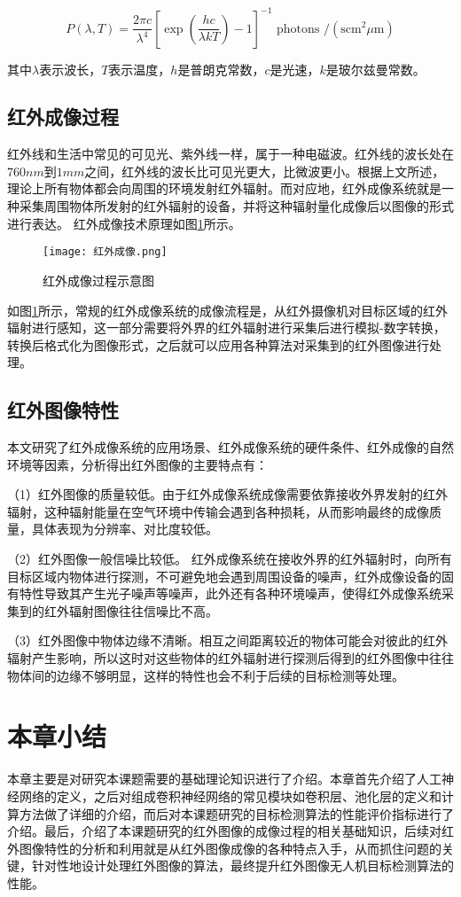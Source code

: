 \begin{equation}
    P(\lambda, T)=\frac{2 \pi c}{\lambda^{4}}\left[\exp \left(\frac{h c}{\lambda k T}\right)-1\right]^{-1} \text { photons } /\left(\mathrm{s} \mathrm{cm}^{2} \mu \mathrm{m}\right)
    \label{plank2}    
\end{equation}

其中$\lambda$表示波长，$T$表示温度，$h$是普朗克常数，$c$是光速，$k$是玻尔兹曼常数。

\subsection{红外成像过程}

红外线和生活中常见的可见光、紫外线一样，属于一种电磁波。红外线的波长处在$760nm$到$1mm$之间，红外线的波长比可见光更大，比微波更小。根据上文所述，理论上所有物体都会向周围的环境发射红外辐射。而对应地，红外成像系统就是一种采集周围物体所发射的红外辐射的设备，并将这种辐射量化成像后以图像的形式进行表达。
红外成像技术原理如图\ref{infra}所示\cite{倪国强2008中国红外成像技术发展的若干思考}。

\begin{figure}[htbp]
    \centering
    \texttt{[image: 红外成像.png]}
    \caption{红外成像过程示意图}
    \label{infra}
\end{figure}

如图\ref{infra}所示，常规的红外成像系统的成像流程是，从红外摄像机对目标区域的红外辐射进行感知，这一部分需要将外界的红外辐射进行采集后进行模拟-数字转换，转换后格式化为图像形式，之后就可以应用各种算法对采集到的红外图像进行处理。

\subsection{红外图像特性} 

本文研究了红外成像系统的应用场景、红外成像系统的硬件条件、红外成像的自然环境等因素，分析得出红外图像的主要特点有：

（1）红外图像的质量较低。由于红外成像系统成像需要依靠接收外界发射的红外辐射，这种辐射能量在空气环境中传输会遇到各种损耗，从而影响最终的成像质量，具体表现为分辨率、对比度较低。

（2）红外图像一般信噪比较低。
红外成像系统在接收外界的红外辐射时，向所有目标区域内物体进行探测，不可避免地会遇到周围设备的噪声，红外成像设备的固有特性导致其产生光子噪声等噪声，此外还有各种环境噪声，使得红外成像系统采集到的红外辐射图像往往信噪比不高。

（3）红外图像中物体边缘不清晰。相互之间距离较近的物体可能会对彼此的红外辐射产生影响，所以这时对这些物体的红外辐射进行探测后得到的红外图像中往往物体间的边缘不够明显，这样的特性也会不利于后续的目标检测等处理。

\section{本章小结}
本章主要是对研究本课题需要的基础理论知识进行了介绍。本章首先介绍了人工神经网络的定义，之后对组成卷积神经网络的常见模块如卷积层、池化层的定义和计算方法做了详细的介绍，而后对本课题研究的目标检测算法的性能评价指标进行了介绍。最后，介绍了本课题研究的红外图像的成像过程的相关基础知识，后续对红外图像特性的分析和利用就是从红外图像成像的各种特点入手，从而抓住问题的关键，针对性地设计处理红外图像的算法，最终提升红外图像无人机目标检测算法的性能。


